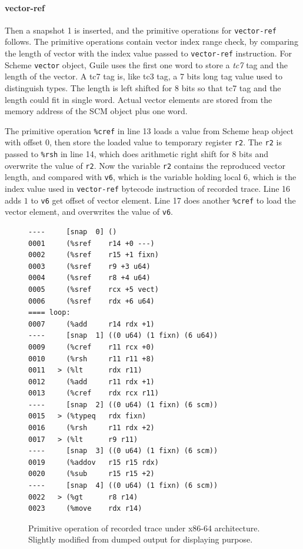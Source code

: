 \documentclass[preprint, 10pt]{sigplanconf}
\begin{document}
\paragraph{vector-ref} Then a snapshot 1 is inserted, and
the primitive operations for \texttt{vector-ref} follows. The primitive
operations contain vector index range check, by comparing the length of vector
with the index value passed to \texttt{vector-ref} instruction. For Scheme
\texttt{vector} object, Guile uses the first one word to store a \textit{tc7}
tag and the length of the vector. A tc7 tag is, like tc3 tag, a 7 bits long
tag value used to distinguish types. The length is left shifted for 8 bits so
that tc7 tag and the length could fit in single word. Actual vector elements
are stored from the memory address of the SCM object plus one word.

The primitive operation \texttt{\%cref} in line 13 loads a value from Scheme
heap object with offset 0, then store the loaded value to temporary register
\texttt{r2}. The \texttt{r2} is passed to \texttt{\%rsh} in line 14, which
does arithmetic right shift for 8 bits and overwrite the value of
\texttt{r2}. Now the variable \texttt{r2} contains the reproduced vector
length, and compared with \texttt{v6}, which is the variable holding local 6,
which is the index value used in \texttt{vector-ref} bytecode instruction of
recorded trace. Line 16 adds $1$ to \texttt{v6} get offset of vector
element. Line 17 does another \texttt{\%cref} to load the vector element, and
overwrites the value of \texttt{v6}.

\begin{figure}
  \centering
  \small
\begin{verbatim}
----     [snap  0] ()
0001     (%sref    r14 +0 ---)
0002     (%sref    r15 +1 fixn)
0003     (%sref    r9 +3 u64)
0004     (%sref    r8 +4 u64)
0005     (%sref    rcx +5 vect)
0006     (%sref    rdx +6 u64)
==== loop:
0007     (%add     r14 rdx +1)
----     [snap  1] ((0 u64) (1 fixn) (6 u64))
0009     (%cref    r11 rcx +0)
0010     (%rsh     r11 r11 +8)
0011   > (%lt      rdx r11)
0012     (%add     r11 rdx +1)
0013     (%cref    rdx rcx r11)
----     [snap  2] ((0 u64) (1 fixn) (6 scm))
0015   > (%typeq   rdx fixn)
0016     (%rsh     r11 rdx +2)
0017   > (%lt      r9 r11)
----     [snap  3] ((0 u64) (1 fixn) (6 scm))
0019     (%addov   r15 r15 rdx)
0020     (%sub     r15 r15 +2)
----     [snap  4] ((0 u64) (1 fixn) (6 scm))
0022   > (%gt      r8 r14)
0023     (%move    rdx r14)
\end{verbatim}
\caption{Primitive operation of recorded trace under x86-64
  architecture. Slightly modified from dumped output for displaying purpose.}
\label{fig:primops}
\end{figure}
\end{document}
